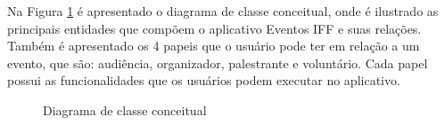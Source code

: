 Na Figura \ref{fig:digrama-classe} é apresentado o diagrama de classe conceitual, onde é ilustrado as principais entidades que compõem o aplicativo Eventos IFF e suas relações. Também é apresentado os 4 papeis que o usuário pode ter em relação a um evento, que são: audiência, organizador, palestrante e voluntário. Cada papel possui as funcionalidades que os usuários podem executar no aplicativo.

\begin{figure}[H]
    \centering
    \caption{Diagrama de classe conceitual}
    \label{fig:digrama-classe}
\end{figure}